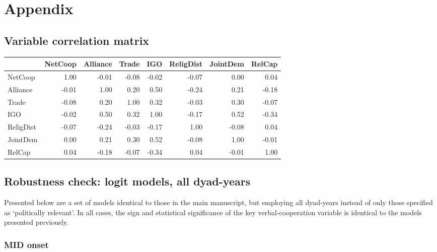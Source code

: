 \documentclass[10pt,]{article}
\let\stdsection\section
\renewcommand\section{\newpage\stdsection}
\begin{document}
\section{Appendix}\label{appendix}

\subsection{Variable correlation
matrix}\label{variable-correlation-matrix}

\begin{tabular}{l|r|r|r|r|r|r|r}
\hline
  & NetCoop & Alliance & Trade & IGO & ReligDist & JointDem & RelCap\\
\hline
NetCoop & 1.00 & -0.01 & -0.08 & -0.02 & -0.07 & 0.00 & 0.04\\
\hline
Alliance & -0.01 & 1.00 & 0.20 & 0.50 & -0.24 & 0.21 & -0.18\\
\hline
Trade & -0.08 & 0.20 & 1.00 & 0.32 & -0.03 & 0.30 & -0.07\\
\hline
IGO & -0.02 & 0.50 & 0.32 & 1.00 & -0.17 & 0.52 & -0.34\\
\hline
ReligDist & -0.07 & -0.24 & -0.03 & -0.17 & 1.00 & -0.08 & 0.04\\
\hline
JointDem & 0.00 & 0.21 & 0.30 & 0.52 & -0.08 & 1.00 & -0.01\\
\hline
RelCap & 0.04 & -0.18 & -0.07 & -0.34 & 0.04 & -0.01 & 1.00\\
\hline
\end{tabular}

\subsection{Robustness check: logit models, all
dyad-years}\label{robustness-check-logit-models-all-dyad-years}

Presented below are a set of models identical to those in the main
manuscript, but employing all dyad-years instead of only those specified
as `politically relevant'. In all cases, the sign and statistical
significance of the key verbal-cooperation variable is identical to the
models presented previously.

\subsubsection{MID onset}\label{mid-onset}
\end{document}
